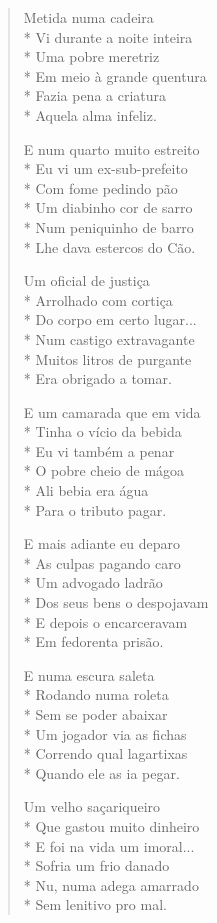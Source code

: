 \begin{verse}
Metida numa cadeira\\*
Vi durante a noite inteira\\*
Uma pobre meretriz\\*
Em meio à grande quentura\\*
Fazia pena a criatura\\*
Aquela alma infeliz.

E num quarto muito estreito\\*
Eu vi um ex-sub-prefeito\\*
Com fome pedindo pão\\*
Um diabinho cor de sarro\\*
Num peniquinho de barro\\*
Lhe dava estercos do Cão.

Um oficial de justiça\\*
Arrolhado com cortiça\\*
Do corpo em certo lugar...\\*
Num castigo extravagante\\*
Muitos litros de purgante\\*
Era obrigado a tomar.

E um camarada que em vida\\*
Tinha o vício da bebida\\*
Eu vi também a penar\\*
O pobre cheio de mágoa\\*
Ali bebia era água\\*
Para o tributo pagar.

E mais adiante eu deparo\\*
As culpas pagando caro\\*
Um advogado ladrão\\*
Dos seus bens o despojavam\\*
E depois o encarceravam\\*
Em fedorenta prisão.

E numa escura saleta\\*
Rodando numa roleta\\*
Sem se poder abaixar\\*
Um jogador via as fichas\\*
Correndo qual lagartixas\\*
Quando ele as ia pegar.

Um velho saçariqueiro\\*
Que gastou muito dinheiro\\*
E foi na vida um imoral...\\*
Sofria um frio danado\\*
Nu, numa adega amarrado\\*
Sem lenitivo pro mal.


\end{verse}
